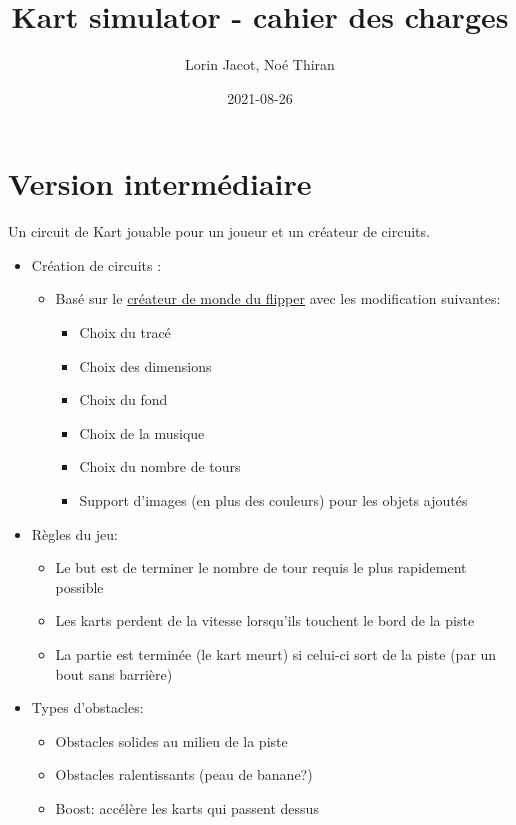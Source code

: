 \documentclass{article}
\title{Kart simulator - cahier des charges}
\date{2021-08-26}
\author{Lorin Jacot, Noé Thiran}
\begin{document}
\maketitle

\section{Version intermédiaire}

Un circuit de Kart jouable pour un joueur et un créateur de circuits.

\begin{itemize}
    \item Création de circuits :
          \begin{itemize}
              \item Basé sur le \href{https://lj44.ch/creator/flipper}{créateur de monde du flipper} avec les modification suivantes: \begin{itemize}
                        \item Choix du tracé
                        \item Choix des dimensions
                        \item Choix du fond
                        \item Choix de la musique
                        \item Choix du nombre de tours
                        \item Support d'images (en plus des couleurs) pour les objets ajoutés
                    \end{itemize}
          \end{itemize}
    \item Règles du jeu: \begin{itemize}
        \item Le but est de terminer le nombre de tour requis le plus rapidement possible
        \item Les karts perdent de la vitesse lorsqu'ils touchent le bord de la piste
        \item La partie est terminée (le kart meurt) si celui-ci sort de la piste (par un bout sans barrière)
    \end{itemize}
    \item Types d'obstacles:\begin{itemize}
        \item Obstacles solides au milieu de la piste
        \item Obstacles ralentissants (peau de banane?)
        \item Boost: accélère les karts qui passent dessus

\end{itemize}
\end{itemize}
\end{document}
